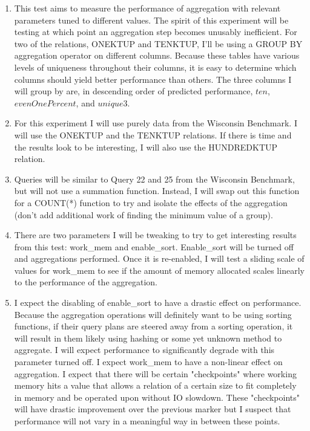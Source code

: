 \documentclass[11pt,letterpaper]{article}
\begin{document}
\begin{enumerate}
\begin{enumerate}
\begin{enumerate}
 		\item This test aims to measure the performance of aggregation with relevant parameters tuned to different values.  The spirit of this experiment will be testing at which point an aggregation step becomes unusably inefficient.  For two of the relations, ONEKTUP and TENKTUP, I'll be using a GROUP BY aggregation operator on different columns. Because these tables have various levels of uniqueness throughout their columns, it is easy to determine which columns should yield better performance than others.  The three columns I will group by are, in descending order of predicted performance, $ten$, $evenOnePercent$, and $unique3$. 
 		\item For this experiment I will use purely data from the Wisconsin Benchmark.  I will use the ONEKTUP and the TENKTUP relations.  If there is time and the results look to be interesting, I will also use the HUNDREDKTUP relation.
 		\item Queries will be similar to Query 22 and 25 from the Wisconsin Benchmark, but will not use a summation function.  Instead, I will swap out this function for a COUNT(*) function to try and isolate the effects of the aggregation (don't add additional work of finding the minimum value of a group).
 		\item There are two parameters I will be tweaking to try to get interesting results from this test: work\_mem and enable\_sort.  Enable\_sort will be turned off and aggregations performed.  Once it is re-enabled, I will test a sliding scale of values for work\_mem to see if the amount of memory allocated scales linearly to the performance of the aggregation.
 		\item I expect the disabling of enable\_sort to have a drastic effect on performance.  Because the aggregation operations will definitely want to be using sorting functions, if their query plans are steered away from a sorting operation, it will result in them likely using hashing or some yet unknown method to aggregate.  I will expect performance to significantly degrade with this parameter turned off.  I expect work\_mem to have a non-linear effect on aggregation.  I expect that there will be certain "checkpoints" where working memory hits a value that allows a relation of a certain size to fit completely in memory and be operated upon without IO slowdown.  These "checkpoints" will have drastic improvement over the previous marker but I suspect that performance will not vary in a meaningful way in between these points. 
 		

\end{enumerate}
\end{enumerate}
\end{enumerate}
\end{document}
